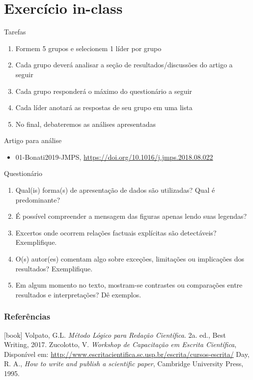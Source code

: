 %
\section{Exercício in-class}
%
\begin{frame}{Tarefas}
\begin{enumerate}
\item Formem 5 grupos e selecionem 1 líder por grupo
\item Cada grupo deverá analisar a seção de resultados/discussões do artigo a seguir
\item Cada grupo responderá o máximo do questionário a seguir
\item Cada líder anotará as respostas de seu grupo em uma lista
\item No final, debateremos as análises apresentadas
\end{enumerate}
\end{frame}

\begin{frame}{Artigo para análise} 
\begin{itemize}
\item 01-Bonati2019-JMPS, \url{https://doi.org/10.1016/j.jmps.2018.08.022}
\end{itemize}
\end{frame}

\begin{frame}{Questionário}
\begin{enumerate}
\item Qual(is) forma(s) de apresentação de dados são utilizadas? Qual é predominante? 
\item É possível compreender a mensagem das figuras apenas lendo suas legendas? 
\item Excertos onde ocorrem relações factuais explícitas são detectáveis? Exemplifique.
\item O(s) autor(es) comentam algo sobre exceções, limitações ou implicações dos resultados? Exemplifique. 
\item Em algum momento no texto, mostram-se contrastes ou comparações entre resultados e interpretações? Dê exemplos.
\end{enumerate}
\end{frame}

\begin{frame}[allowframebreaks]
\frametitle{Referências}
\begin{thebibliography}{9}
[book]
%
Volpato, G.L. \textit{Método Lógico para Redação Científica}. 2a. ed., Best Writing, 2017.
%
Zucolotto, V. \textit{Workshop de Capacitação em Escrita Científica}, Disponível em: \url{http://www.escritacientifica.sc.usp.br/escrita/cursos-escrita/}
%
 Day, R. A., \textit{How to write and publish a scientific paper}, Cambridge University Press, 1995.
\end{thebibliography}
\end{frame}